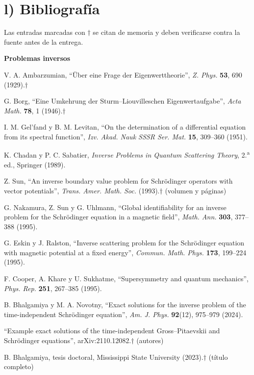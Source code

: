 \documentclass[12pt,letterpaper]{article}
\begin{document}
\section*{l) Bibliografía}
\small Las entradas marcadas con $\dagger$ se citan de memoria y deben verificarse contra la fuente antes de la entrega.
\begin{enumerate}[leftmargin=2em,label={[\arabic*]}]
\item[] \textbf{Problemas inversos}
  \item V. A. Ambarzumian, ``Über eine Frage der Eigenwerttheorie'', \emph{Z. Phys.} \textbf{53}, 690 (1929).$\dagger$
  \item G. Borg, ``Eine Umkehrung der Sturm--Liouvilleschen Eigenwertaufgabe'', \emph{Acta Math.} \textbf{78}, 1 (1946).$\dagger$
  \item I. M. Gel'fand y B. M. Levitan, ``On the determination of a differential equation from its spectral function'',
        \emph{Izv. Akad. Nauk SSSR Ser. Mat.} \textbf{15}, 309--360 (1951).
  \item K. Chadan y P. C. Sabatier, \emph{Inverse Problems in Quantum Scattering Theory}, 2.\textsuperscript{a} ed.,
        Springer (1989).
  \item Z. Sun, ``An inverse boundary value problem for Schrödinger operators with vector potentials'', \emph{Trans. Amer.
        Math. Soc.} (1993).$\dagger$ (volumen y páginas)
  \item G. Nakamura, Z. Sun y G. Uhlmann, ``Global identifiability for an inverse problem for the Schrödinger equation in a
        magnetic field'', \emph{Math. Ann.} \textbf{303}, 377--388 (1995).
  \item G. Eskin y J. Ralston, ``Inverse scattering problem for the Schrödinger equation with magnetic potential at a fixed
        energy'', \emph{Commun. Math. Phys.} \textbf{173}, 199--224 (1995).
  \item F. Cooper, A. Khare y U. Sukhatme, ``Supersymmetry and quantum mechanics'', \emph{Phys. Rep.} \textbf{251},
        267--385 (1995).
  \item B. Bhalgamiya y M. A. Novotny, ``Exact solutions for the inverse problem of the time-independent Schrödinger
        equation'', \emph{Am. J. Phys.} \textbf{92}(12), 975--979 (2024).
  \item ``Example exact solutions of the time-independent Gross--Pitaevskii and Schrödinger equations'',
        arXiv:2110.12082.$\dagger$ (autores)
  \item B. Bhalgamiya, tesis doctoral, Mississippi State University (2023).$\dagger$ (título completo)

\end{enumerate}
\end{document}
